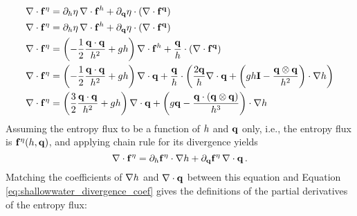 \begin{align}
  \nabla\cdot\mathbf{f}^\eta
  &= 
    \partial_h\eta\,\nabla\cdot
    \mathbf{f}^h
  + \partial_{\mathbf{q}}\eta\cdot
    \left(\nabla\cdot\mathbf{f}^{\mathbf{q}}\right)
  \nonumber\\
  \nabla\cdot\mathbf{f}^\eta
  &= 
    \partial_h\eta\,\nabla\cdot
    \mathbf{f}^h
  + \partial_{\mathbf{q}}\eta\cdot
    \left(\nabla\cdot\mathbf{f}^{\mathbf{q}}\right)
  \nonumber\\
  \nabla\cdot\mathbf{f}^\eta
  &= 
    \left(-\frac{1}{2}\frac{\mathbf{q}\cdot\mathbf{q}}{h^2}
    + gh\right)
    \nabla\cdot\mathbf{f}^h
    + \frac{\mathbf{q}}{h}\cdot
    \left(\nabla\cdot\mathbf{f}^{\mathbf{q}}\right)
  \nonumber\\
  \nabla\cdot\mathbf{f}^\eta
  &= 
    \left(-\frac{1}{2}\frac{\mathbf{q}\cdot\mathbf{q}}{h^2}
    + gh\right)
    \nabla\cdot\mathbf{q}
    + \frac{\mathbf{q}}{h}\cdot
    \left(\frac{2\mathbf{q}}{h}\nabla\cdot\mathbf{q}
    + \left(gh\mathbf{I}
    - \frac{\mathbf{q}\otimes\mathbf{q}}{h^2}\right)\cdot\nabla h\right)
  \nonumber\\\label{eq:shallowwater_divergence_coef}
  \nabla\cdot\mathbf{f}^\eta
  &= 
    \left(\frac{3}{2}\frac{\mathbf{q}\cdot\mathbf{q}}{h^2}
    + gh\right)
    \nabla\cdot\mathbf{q}
    + \left(g\mathbf{q}
    - \frac{\mathbf{q}\cdot(\mathbf{q}\otimes\mathbf{q})}
    {h^3}\right)\cdot\nabla h
\end{align}
Assuming the entropy flux to be a function of $h$ and $\mathbf{q}$
only, i.e., the entropy flux is
$\mathbf{f}^\eta(h,\mathbf{q})$, and applying
chain rule for its divergence yields
\begin{equation}
  \nabla\cdot\mathbf{f}^\eta
  = \partial_h\mathbf{f}^\eta\cdot\nabla h
  + \partial_{\mathbf{q}}\mathbf{f}^\eta
  \,\nabla\cdot\mathbf{q} \,.
\end{equation}
Matching the coefficients of $\nabla h$ and $\nabla\cdot\mathbf{q}$
between this equation and Equation \eqref{eq:shallowwater_divergence_coef}
gives the definitions of the partial derivatives of the entropy flux:
